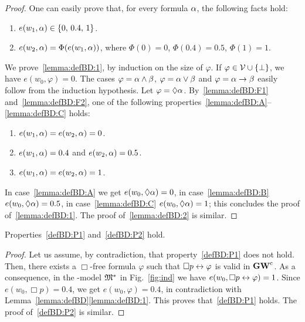 \begin{proof}
  One can easily prove that, for every formula $\alpha$, the following
  facts hold:
  
  \begin{enumerate}[label=(\arabic*), ref=(\arabic*),leftmargin=*]    
  \item\label{lemma:defBD:F1}
    $e(w_1,\alpha)\in\{0,\,0.4,\,1\}$.
    
  \item\label{lemma:defBD:F2}
    $e(w_2,\alpha)=\Phi(e(w_1,\alpha))$,
    where $\Phi(0)=0$,  $\Phi(0.4)=0.5$, $\Phi(1)=1$.
  \end{enumerate}
  We prove~\ref{lemma:defBD:1}, by induction on the size of
  $\varphi$.  If $\varphi\in\mathcal{V}\cup\{\bot\}$, we have $e(w_0,\varphi)
  = 0$.  The cases $\varphi=\alpha\land \beta$, $\varphi=\alpha\lor \beta$ and
  $\varphi=\alpha\to \beta$ easily follow from the induction hypothesis.  Let
  $\varphi = \lozenge \alpha$.  By~\ref{lemma:defBD:F1}
  and~\ref{lemma:defBD:F2}, one of the following
  properties~\ref{lemma:defBD:A}--\ref{lemma:defBD:C} holds:

  
  \begin{enumerate}[label=(\alph*), ref=(\alph*),leftmargin=*]    
  \item\label{lemma:defBD:A} $e(w_1,\alpha) = e(w_2,\alpha) = 0$.
    
  \item\label{lemma:defBD:B} $e(w_1,\alpha) = 0.4$ and $e(w_2,\alpha) = 0.5$.

  \item\label{lemma:defBD:C} $e(w_1,\alpha) = e(w_2,\alpha) = 1$.
  \end{enumerate}
  In case~\ref{lemma:defBD:A} we get $e(w_0,\lozenge \alpha)=0$, in
  case~\ref{lemma:defBD:B} $e(w_0,\lozenge \alpha)=0.5$, in
  case~\ref{lemma:defBD:C} $e(w_0,\lozenge \alpha)=1$; this concludes the
  proof of~\ref{lemma:defBD:1}.  The proof of~\ref{lemma:defBD:2} is
  similar.
\end{proof}



\begin{proposition}\label{prop:gwclBD}
  Properties~\ref{defBD:P1} and~\ref{defBD:P2} hold.
\end{proposition}  

\begin{proof}
  Let us assume, by contradiction, that property~\ref{defBD:P1} does
  not hold.  Then, there exists a $\Box$-free formula $\varphi$ such
  that $\Box p \leftrightarrow\varphi$ is valid in $\mathbf{GW}^\mathrm{c}$. As a consequence, in
  the \GWCM-model $\mathfrak{M}^\ast$ in Fig.~\ref{fig:ind} we have $e(w_0, \Box
  p \leftrightarrow\varphi)=1$. Since $e(w_0, \Box p)= 0.4$, we get $e(w_0,
  \varphi)= 0.4$, in contradiction with
  Lemma~\ref{lemma:defBD}\ref{lemma:defBD:1}.  This proves
  that~\ref{defBD:P1} holds. The proof of~\ref{defBD:P2} is similar.
\end{proof}


